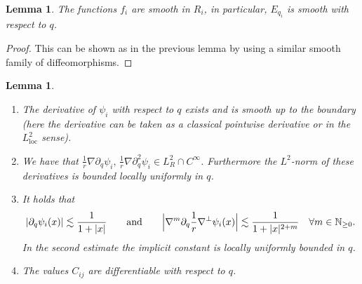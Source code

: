 \documentclass[JEP,XML,SOM,Unicode,published]{cedram}
\newcommand{\loc}{\mathrm{loc}}
\newtheorem{lemma}[theorem]{Lemma}
\theoremstyle{definition}
\newcommand\N{\mathbb{N}}
\let\de\partial
\begin{document}
\begin{lemma}
The functions $f_i$ are smooth in $R_i$, in particular, $E_{q_i}$ is smooth with respect to $q$.
\end{lemma}
\begin{proof}This can be shown as in the previous lemma by using a similar smooth family of diffeomorphisms.\end{proof}

\skpt
\begin{lemma}\label{PsiDeri}
\begin{enumerate}
\item\label{PsiDeria} The derivative of $\psi_i$ with respect to $q$ exists and is smooth up to the boundary (here the derivative can \eg be taken as a classical pointwise derivative or in the $L_{\loc}^2$ sense).
\item\label{PsiDerib} We have that $\frac{1}{r}\nabla\de_q\psi_i,\,\frac{1}{r}\nabla\de_q^2\psi_i\in L_R^2\cap C^\infty$. Furthermore the $L^2$-norm of these derivatives is bounded locally uniformly in $q$.
\item\label{PsiDeric} It holds that
\[
\left|\de_q\psi_i(x)\right|\lesssim \frac{1}{1+|x|}\qquad\text{and}\qquad
\Bigl|\nabla^m\de_q\frac{1}{r}\nabla^\perp\psi_i(x)\Bigr|\lesssim \frac{1}{1+|x|^{2+m}}\quad \forall m\in\N_{\geq0}.
\]
In the second estimate the implicit constant is locally uniformly bounded in $q$.
\item\label{PsiDerid} The values $C_{ij}$ are differentiable with respect to $q$.
\end{enumerate}
\end{lemma}
\end{document}
